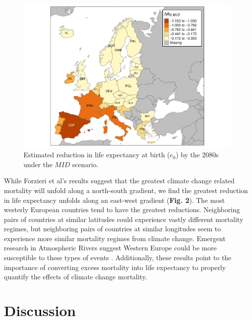 \documentclass[12pt,]{article}
\makeatletter
\def\maxwidth{\ifdim\Gin@nat@width>\linewidth\linewidth
\else\Gin@nat@width\fi}
\let\Oldincludegraphics\includegraphics
\renewcommand{\includegraphics}[1]{\Oldincludegraphics[width=\maxwidth]{#1}}
\makeatother
\begin{document}
\begin{figure}
\centering
\includegraphics{MS-cclifeexpec_files/figure-latex/unnamed-chunk-3-1.pdf}
\caption{Estimated reduction in life expectancy at birth (\(e_0\)) by
the 2080s under the \(MID\) scenario.}
\end{figure}

While Forzieri et al's \citep{forzieri2017increasing} results suggest
that the greatest climate change related mortality will unfold along a
north-south gradient, we find the greatest reduction in life expectancy
unfolds along an east-west gradient (\textbf{Fig. 2}). The most westerly
European countries tend to have the greatest reductions. Neighboring
pairs of countries at similar latitudes could experience vastly
different mortality regimes, but neighboring pairs of countries at
similar longitudes seem to experience more similar mortality regimes
from climate change. Emergent research in Atmospheric Rivers suggest
Western Europe could be more susceptible to these types of events
\citep{ramos2015daily}. Additionally, these results point to the
importance of converting excess mortality into life expectancy to
properly quantify the effects of climate change mortality.

\section{Discussion}\label{discussion}
\end{document}
